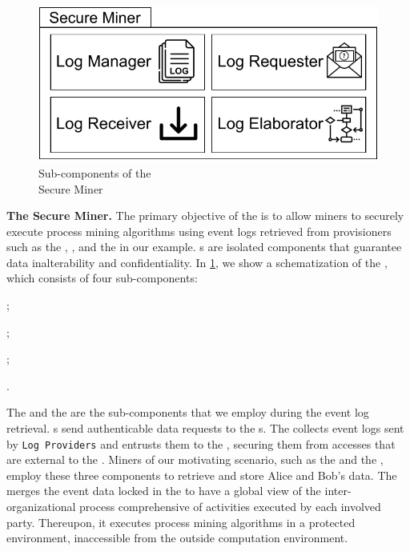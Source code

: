 \begin{figure}
	\centering
	\includegraphics[width=1\textwidth]{content/figures/secureminersad.pdf}
	\caption[Secure Miner sub-components]{Sub-components of the \\Secure Miner}
	\label{fig:trusted_miner}
	\vspace{-6pt}
\end{figure} 
\noindent\textbf{The Secure Miner.}
The primary objective of the  is to allow miners to securely execute process mining algorithms using event logs retrieved from provisioners such as the , , and the  in our example. s are isolated components that guarantee data inalterability and confidentiality. In \cref{fig:trusted_miner}, we show a schematization of the , which consists of four sub-components:
\begin{inparaenum}
    \item {};
    \item {};
    \item {}; 
    \item {}.
\end{inparaenum}
The  and the  are the sub-components that we employ during the event log retrieval. s send authenticable data requests to the s. The  collects event logs sent by \texttt{Log Providers} and entrusts them to the , securing them from accesses that are external to the .
Miners of our motivating scenario, such as the  and the , employ these three components to retrieve and store Alice and Bob's data. The  merges the event data locked in the  to have a global view of the inter-organizational process comprehensive of activities executed by each involved party. Thereupon, it executes process mining algorithms in a protected environment, inaccessible from the outside computation environment.
